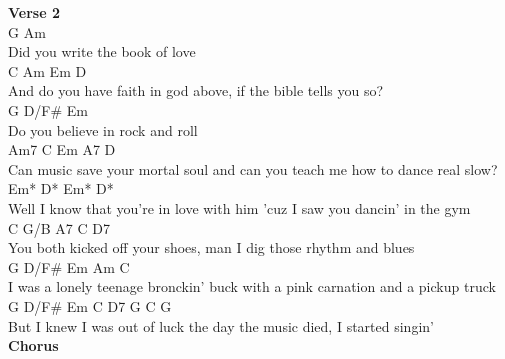 \documentclass[a4paper]{article}
\begin{document}
{{        }
        \textbf{Verse 2}
        ~\\
        {
            \cutive
            \obeyspaces
G                 Am
\\
Did you write the book of love
\\
       C                 Am         Em           D
\\
And do you have faith in god above, if the bible tells you so?
\\
G      D/F\#        Em
\\
Do you believe in rock and roll
\\
    Am7            C              Em                 A7           D
\\
Can music save your mortal soul and can you teach me how to dance real slow?
\\
       Em*                  D*                   Em*             D*
\\
Well I know that you're in love with him 'cuz I saw you dancin' in the gym
\\
    C           G/B      A7           C                    D7
\\
You both kicked off your shoes, man I dig those rhythm and blues
\\
        G      D/F\#     Em                   Am                   C
\\
I was a lonely teenage bronckin' buck with a pink carnation and a pickup truck
\\
    G     D/F\#    Em              C       D7    G  C  G
\\
But I knew I was out of luck the day the music died, I started singin'
\\

        }
        \textbf{Chorus}
        ~\\
        {
            \cutive
            \obeyspaces

}}
\end{document}
